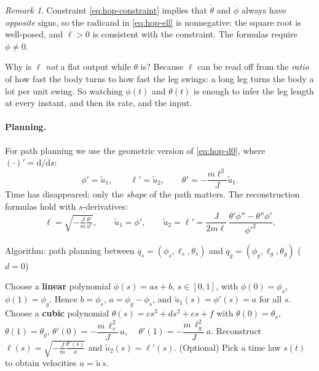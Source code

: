\documentclass[11pt,a4paper]{article}
\def\boldsymbol#1{#1}%
\newcommand{\q}{\boldsymbol{q}}
\theoremstyle{definition}
\theoremstyle{plain}
\theoremstyle{remark}
\newtheorem*{remark}{Remark}
\begin{document}
\begin{remark}
Constraint \eqref{eq:hop-constraint} implies that $\dot\theta$ and $\dot\phi$ always have \emph{opposite} signs, so the radicand in \eqref{eq:hop-ell} is nonnegative: the square root is well-posed, and $\ell>0$ is consistent with the constraint. The formulas require $\dot\phi\neq0$.
\end{remark}

\begin{intuition}
Why is $\ell$ \emph{not} a flat output while $\theta$ is? Because $\ell$ can be read off from the \emph{ratio} of how fast the body turns to how fast the leg swings: a long leg turns the body a lot per unit swing. So watching $\phi(t)$ and $\theta(t)$ is enough to infer the leg length at every instant, and then its rate, and the input.
\end{intuition}

\paragraph{Planning.} For path planning we use the geometric version of \eqref{eq:hop-d0}, where $(\cdot)'=\mathrm d/\mathrm ds$:
\begin{equation}
  \phi'=\tilde u_1,\qquad \ell'=\tilde u_2,\qquad \theta'=-\frac{m\ell^2}{J}\tilde u_1 .
  \label{eq:hop-geo}
\end{equation}
Time has disappeared: only the \emph{shape} of the path matters. The reconstruction formulas hold with $s$-derivatives:
\[
  \ell=\sqrt{-\tfrac{J}{m}\tfrac{\theta'}{\phi'}},\qquad
  \tilde u_1=\phi',\qquad
  \tilde u_2=\ell'=\frac{J}{2m\ell}\,\frac{\theta'\phi''-\theta''\phi'}{\phi'^2}.
\]

\begin{algbox}{Algorithm: path planning between $\q_s=(\phi_s,\ell_s,\theta_s)$ and $\q_g=(\phi_g,\ell_g,\theta_g)$ ($d=0$)}
\begin{algorithmic}[1]
  \State Choose a \textbf{linear} polynomial $\phi(s)=as+b$, $s\in[0,1]$, with $\phi(0)=\phi_s$, $\phi(1)=\phi_g$.
  \Statex \hspace{\algorithmicindent} Hence $b=\phi_s$, $a=\phi_g-\phi_s$, and $\tilde u_1(s)=\phi'(s)=a$ for all $s$.
  \State Choose a \textbf{cubic} polynomial $\theta(s)=cs^3+ds^2+es+f$ with
  \Statex \hspace{\algorithmicindent} $\theta(0)=\theta_s$, $\theta(1)=\theta_g$,
  \Statex \hspace{\algorithmicindent} $\theta'(0)=-\dfrac{m\,\ell_s^2}{J}\,a$, $\quad\theta'(1)=-\dfrac{m\,\ell_g^2}{J}\,a$.
  \State Reconstruct $\ell(s)=\sqrt{-\frac{J}{m}\frac{\theta'(s)}{a}}$ and $\tilde u_2(s)=\ell'(s)$.
  \State (Optional) Pick a time law $s(t)$ to obtain velocities $u=\tilde u\,\dot s$.
\end{algorithmic}
\end{algbox}
\end{document}
